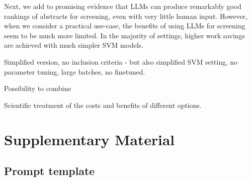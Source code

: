 \documentclass{article}
\begin{document}
	Next, we add to promising evidence that LLMs can produce remarkably good rankings of abstracts for screening, even with very little human input. However, when we consider a practical use-case, the benefits of using LLMs for screening seem to be much more limited. In the majority of settings, higher work savings are achieved with much simpler SVM models.
	
	Simplified version, no inclusion criteria - but also simplified SVM setting, no parameter tuning, large batches, no finetuned.
	
	Possibility to combine
	
	Scientific treatment of the costs and benefits of different options. 
	
	
	
	
	
	
	
	\appendix
	
	\section*{Supplementary Material}
	
	\subsection*{Prompt template}
	
	
\end{document}
